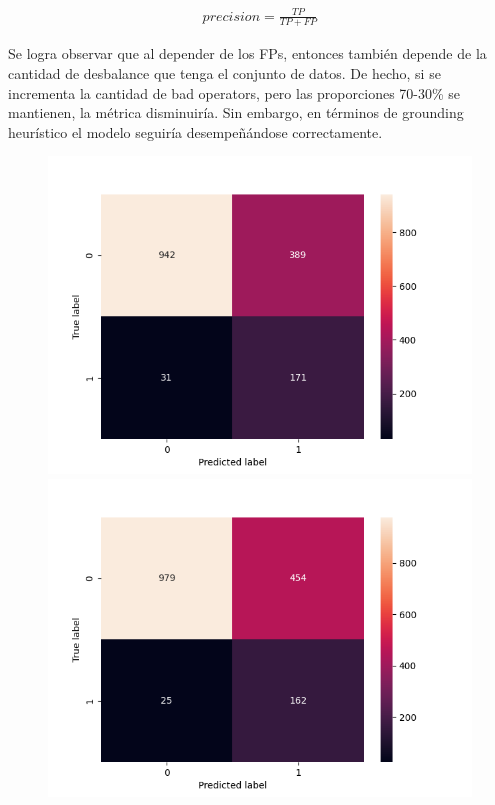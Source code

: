 \begin{align*}
    precision = \frac{TP}{TP + FP}
\end{align*}

Se logra observar que al depender de los FPs, entonces también depende de la
cantidad de desbalance que tenga el conjunto de datos. De hecho, si se
incrementa la cantidad de bad operators, pero las proporciones 70-30\% se
mantienen, la métrica disminuiría. Sin embargo, en términos de grounding
heurístico el modelo seguiría desempeñándose correctamente.

\begin{figure}[h!]
    \includegraphics[width=\linewidth]{figures/results/ad-hoc/nn/calibrate/2021-12-06_17.03.17.314982_set_1_confusion_matrix_raw.png}
    \endminipage
    \includegraphics[width=\linewidth]{figures/results/ad-hoc/nn/calibrate/2021-12-06_17.03.17.314982_set_2_confusion_matrix_raw.png}
    \endminipage
        

\end{figure}
